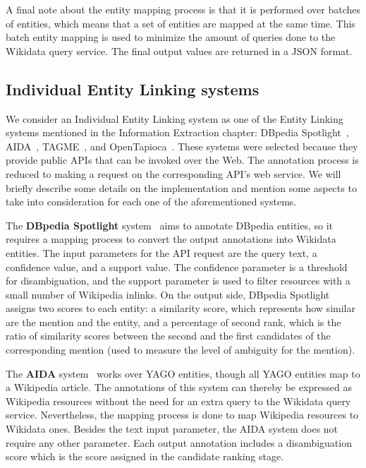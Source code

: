A final note about the entity mapping process is that it is performed over batches of entities, 
which means that a set of entities are mapped at the same time. This batch entity mapping is 
used to minimize the amount of queries done to the Wikidata query service. The final output 
values are returned in a JSON format.

\subsection{Individual Entity Linking systems}
\label{cap3:system/entLinModule/individualSystems}
We consider an Individual Entity Linking system as one of the Entity Linking systems mentioned 
in the Information Extraction chapter: DBpedia Spotlight~\cite{EL:dbpedia-spotlight-MendesJGB11}, 
AIDA~\cite{EL:aida-tool-YosefHBSW11, EL:aida-HoffartYBFPSTTW11}, TAGME~\cite{EL:tagme-FerraginaS10}, 
and OpenTapioca~\cite{EL:opentapioca-Delpeuch19}. These systems were selected because they 
provide public APIs that can be invoked over the Web. The annotation process is reduced to 
making a request on the corresponding API’s web service. We will briefly describe some details 
on the implementation and mention some aspects to take into consideration for each one of the 
aforementioned systems.

The \textbf{DBpedia Spotlight} system~\cite{EL:dbpedia-spotlight-MendesJGB11} aims to 
annotate DBpedia entities, so it requires a mapping process to convert the output annotations 
into Wikidata entities. The input parameters for the API request are the query text, a 
confidence value, and a support value. The confidence parameter is a threshold for disambiguation, 
and the support parameter is used to filter resources with a small number of Wikipedia 
inlinks. On the output side, DBpedia Spotlight assigns two scores to each entity: a 
similarity score, which represents how similar are the mention and the entity, and a 
percentage of second rank, which is the ratio of similarity scores between the second and the 
first candidates of the corresponding mention (used to measure the level of ambiguity for the 
mention).

The \textbf{AIDA} system~\cite{EL:aida-tool-YosefHBSW11, EL:aida-HoffartYBFPSTTW11} works over 
YAGO entities, though all YAGO entities map to a Wikipedia article. The annotations of this 
system can thereby be expressed as Wikipedia resources without the need for an extra query to 
the Wikidata query service. Nevertheless, the mapping process is done to map Wikipedia resources 
to Wikidata ones. Besides the text input parameter, the AIDA system does not require any other 
parameter. Each output annotation includes a disambiguation score which is the score assigned 
in the candidate ranking stage.

